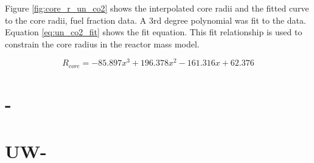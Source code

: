 Figure \ref{fig:core_r_un_co2} shows the interpolated core radii and the fitted
curve to the core radii, fuel fraction data. A 3rd degree polynomial was fit to
the data. Equation \ref{eq:un_co2_fit} shows the fit equation. This fit
relationship is used to constrain the core radius in the reactor mass model.

\begin{equation}
    R_{core} = -85.897x^3 + 196.378x^2 -161.316x + 62.376
    \label{eq:un_co2_fit}
\end{equation}

\section{\uox-\water}

\section{UW-\water}

